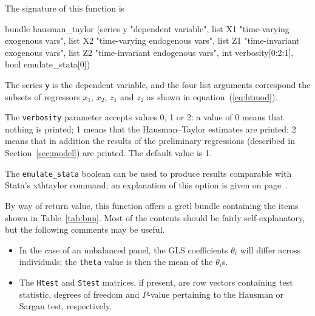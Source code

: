 \documentclass{article}
\begin{document}
The signature of this function is
%
\begin{code}
bundle hausman_taylor (series y "dependent variable", 
                       list X1 "time-varying exogenous vars",
                       list X2 "time-varying endogenous vars", 
                       list Z1 "time-invariant exogenous vars",
                       list Z2 "time-invariant endogenous vars",
                       int verbosity[0:2:1],
                       bool emulate_stata[0])
\end{code}

The series \texttt{y} is the dependent variable, and the four list
arguments correspond the subsets of regressors $x_1$, $x_2$, $z_1$ and
$z_2$ as shown in equation~(\ref{eq:htmod}).

The \texttt{verbosity} parameter accepts values 0, 1 or 2: a value of
0 means that nothing is printed; 1 means that the Hausman--Taylor
estimates are printed; 2 means that in addition the results of the
preliminary regressions (described in Section~\ref{sec:model}) are
printed. The default value is 1.

The \texttt{emulate\_stata} boolean can be used to produce results
comparable with Stata's \textsf{xthtaylor} command; an explanation of
this option is given on page~\pageref{stata2}.\label{stata1}

By way of return value, this function offers a gretl bundle containing
the items shown in Table~\ref{tab:bun}. Most of the contents should be
fairly self-explanatory, but the following comments may be useful.
\begin{itemize}
\item In the case of an unbalanced panel, the GLS coefficients
  $\theta_i$ will differ across individuals; the \texttt{theta} value
  is then the mean of the $\theta_i$s.
\item The \texttt{Htest} and \texttt{Stest} matrices, if present, are
  row vectors containing test statistic, degrees of freedom and
  $P$-value pertaining to the Hausman or Sargan test, respectively.
\end{itemize}
\end{document}
